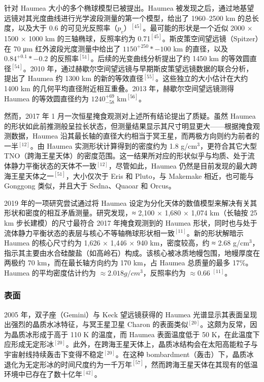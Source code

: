 针对 Haumea 大小的多个椭球模型已被提出。Haumea 被发现之后，通过地基望远镜对其光度曲线进行光学波段测量的第一个模型，给出了 1960–2500 km 的总长度，以及大于 0.6 的可见光反照率（$p_v$）$^{[45]}$。最可能的形状是一个近似 2000 × 1500 × 1000 km 的三轴椭球，反照率约为 0.71$^{[45]}$。斯皮策空间望远镜（Spitzer）在 70 μm 红外波段光度测量中给出了 $1150^{+250}*{-100}$ km 的直径，以及 $0.84^{+0.1}*{-0.2}$ 的反照率$^{[51]}$。后续的光变曲线分析提出了约 1450 km 的等效圆直径$^{[54]}$。2010 年，通过赫歇尔空间望远镜与早期斯皮策望远镜数据的联合分析，提出了 Haumea 约 1300 km 的新的等效直径$^{[55]}$。这些独立的大小估计在大约 1400 km 的几何平均直径附近相互重叠。2013 年，赫歇尔空间望远镜测得 Haumea 的等效圆直径约为 $1240^{+69}_{-58}$ km$^{[56]}$。

然而，2017 年 1 月一次恒星掩食观测对上述所有结论提出了质疑。虽然 Haumea 的形状如此前推测般呈拉长状态，但测量结果显示其尺寸明显更大——根据掩食观测数据，Haumea 沿其最长轴的直径大约相当于冥王星，而两极方向则约为前者的一半$^{[12]}$。由 Haumea 实测形状计算得到的密度约为 1.8 g/cm$^3$，更符合其它大型 TNO（跨海王星天体）的密度范围。这一结果所对应的形状似乎与均质、处于流体静力平衡状态的天体不一致$^{[12]}$，尽管如此，Haumea 仍然是目前发现的最大跨海王星天体之一$^{[51]}$，大小仅次于 Eris 和 Pluto，与 Makemake 相近，也可能与 Gonggong 类似，并且大于 Sedna、Quaoar 和 Orcus。

2019 年的一项研究尝试通过将 Haumea 设定为分化天体的数值模型来解决有关其形状和密度的相互矛盾测量。研究发现，≈ 2,100 × 1,680 × 1,074 km（长轴按 25 km 步长建模）的尺寸最符合 2017 年掩食观测到的 Haumea 形状，同时也与处于流体静力平衡状态的表层与核心不等轴椭球形状相一致$^{[11]}$。新的形状解暗示 Haumea 的核心尺寸约为 1,626 × 1,446 × 940 km，密度较高，约 ≈ 2.68 g/cm$^3$，指示其主要由水合硅酸盐（如高岭石）构成。该核心被冰质地幔包围，地幔厚度在两极约 70 km，而在最长轴方向约为 170 km，占 Haumea 总质量的最多 17\%。Haumea 的平均密度估计约为 $\approx2.018 g/cm^3$，反照率约为 $\approx0.66$ $^{[11]}$。
\subsubsection{表面}
2005 年，双子座（Gemini）与 Keck 望远镜获得的 Haumea 光谱显示其表面呈现出强烈的晶质水冰特征，与冥王星卫星 Charon 的表面类似$^{[20]}$。这颇为反常，因为晶质冰形成于高于 110 K 的温度，而 Haumea 表面温度低于 50 K，在此温度下应形成无定形冰$^{[20]}$。此外，在跨海王星天体上，晶质冰结构会在太阳高能粒子与宇宙射线持续轰击下变得不稳定$^{[20]}$。在这种 bombardment（轰击）下，晶质冰退化为无定形冰的时间尺度约为一千万年$^{[57]}$，然而跨海王星天体在其现有的低温环境中已存在了数十亿年$^{[42]}$。


